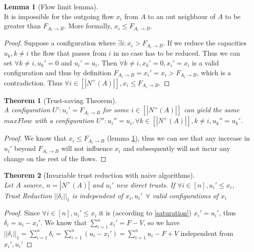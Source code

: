 \documentclass[11pt]{article}
\newtheorem{theorem}{Theorem}[section]
\theoremstyle{definition}
\theoremstyle{corollary}
\theoremstyle{lemma}
\newtheorem{lemma}{Lemma}[section]
\begin{document}
    \begin{lemma}[Flow limit lemma] \ \\
       \label{flowlimit}
       It is impossible for the outgoing flow $x_i$ from $A$ to an out neighbour of $A$ to be greater than
       $F_{A_i \rightarrow B}$. More formally, $x_i \leq F_{A_i \rightarrow B}$.
    \end{lemma}
    \begin{proof}
       Suppose a configuration where $\exists i : x_i > F_{A_i \rightarrow B}$. If we reduce the capacities $u_k, k \neq i$
       the flow that passes from $i$ in no case has to be reduced. Thus we can set $\forall k \neq i, u_k' = 0$ and $u_i' =
       u_i$. Then $\forall k \neq i,x_k' = 0, x_i' = x_i$ is a valid configuration and thus by definition $F_{A_i \rightarrow
       B} = x_i' = x_i > F_{A_i \rightarrow B}$, which is a contradiction. Thus $\forall i \in [|N^{+}(A)|], x_i \leq
       F_{A_i \rightarrow B}$.
    \end{proof}

    \begin{theorem}[Trust-saving Theorem] \ \\
    \label{trustsave}
       A configuration $U' : u_i' = F_{A_i \rightarrow B}$ for some $i \in [|N^{+}(A)|]$ can yield the same $maxFlow$ with a
       configuration $U'' : u_i'' = u_i, \forall k \in [|N^{+}(A)|], k \neq i, u_k'' = u_k'$.
    \end{theorem}
    \begin{proof}
       We know that $x_i \leq F_{A_i \rightarrow B}$ (lemma \ref{flowlimit}), thus we can see that any increase in $u_i'$
       beyond $F_{A_i \rightarrow B}$ will not influence $x_i$ and subsequently will not incur any change on the rest of the
       flows.
    \end{proof}

    \begin{theorem}[Invariable trust reduction with naive algorithms] \ \\
    \label{invariability}
       Let $A$ source, $n = |N^{+}(A)|$ and $u_i'$ new direct trusts. If $\forall i \in [n],u_i' \leq x_i$,
       Trust Reduction $||\delta_i||_1$ is independent of $x_i, u_i' \:\: \forall$ valid configurations of $x_i$
    \end{theorem}
    \begin{proof} 
       Since $\forall i \in [n],u_i' \leq x_i$ it is (according to \ref{saturation}) $x_i' = u_i'$, thus
       $\delta_i = u_i - x_i'$. We know that $\sum\limits_{i=1}^{n}x_i' = F - V$, so we have $||\delta_i||_1 =
       \sum\limits_{i=1}^{n}\delta_i = \sum\limits_{i=1}^{n}(u_i - x_i') = \sum\limits_{i=1}^{n}u_i - F + V$ independent
       from $x_i', u_i'$
    \end{proof}
\end{document}
